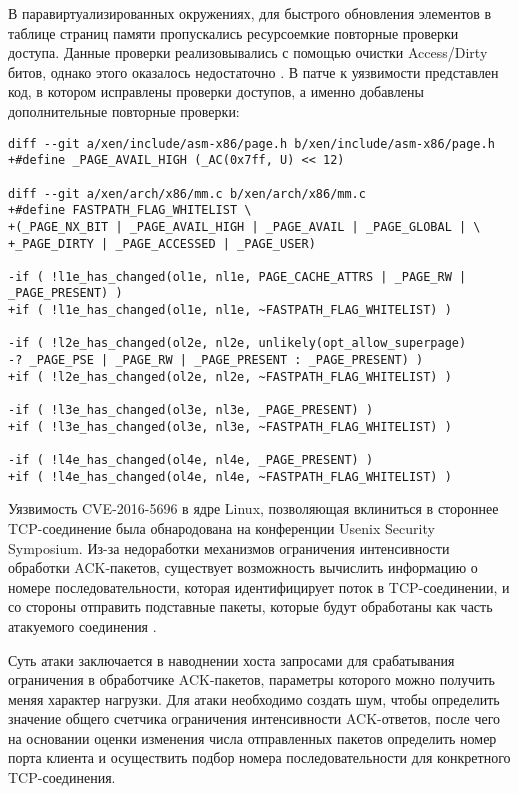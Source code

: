 В паравиртуализированных окружениях, для быстрого обновления элементов в таблице страниц памяти пропускались ресурсоемкие повторные проверки доступа.
Данные проверки реализовывались с помощью очистки Access/Dirty битов, однако этого оказалось недостаточно \cite{xsa182}.
В патче к уязвимости представлен код, в котором исправлены проверки доступов, а именно добавлены дополнительные повторные проверки:
\begin{lstlisting}
diff --git a/xen/include/asm-x86/page.h b/xen/include/asm-x86/page.h
+#define _PAGE_AVAIL_HIGH (_AC(0x7ff, U) << 12)

diff --git a/xen/arch/x86/mm.c b/xen/arch/x86/mm.c
+#define FASTPATH_FLAG_WHITELIST \
+(_PAGE_NX_BIT | _PAGE_AVAIL_HIGH | _PAGE_AVAIL | _PAGE_GLOBAL | \
+_PAGE_DIRTY | _PAGE_ACCESSED | _PAGE_USER)

-if ( !l1e_has_changed(ol1e, nl1e, PAGE_CACHE_ATTRS | _PAGE_RW | _PAGE_PRESENT) )
+if ( !l1e_has_changed(ol1e, nl1e, ~FASTPATH_FLAG_WHITELIST) )

-if ( !l2e_has_changed(ol2e, nl2e, unlikely(opt_allow_superpage)
-? _PAGE_PSE | _PAGE_RW | _PAGE_PRESENT : _PAGE_PRESENT) )
+if ( !l2e_has_changed(ol2e, nl2e, ~FASTPATH_FLAG_WHITELIST) )

-if ( !l3e_has_changed(ol3e, nl3e, _PAGE_PRESENT) )
+if ( !l3e_has_changed(ol3e, nl3e, ~FASTPATH_FLAG_WHITELIST) )

-if ( !l4e_has_changed(ol4e, nl4e, _PAGE_PRESENT) )
+if ( !l4e_has_changed(ol4e, nl4e, ~FASTPATH_FLAG_WHITELIST) )
\end{lstlisting}

Уязвимость CVE-2016-5696 в ядре Linux, позволяющая вклиниться в стороннее TCP-соединение была обнародована на конференции Usenix Security Symposium.
Из-за недоработки механизмов ограничения интенсивности обработки ACK-пакетов, существует возможность вычислить информацию о номере последовательности, которая идентифицирует поток в TCP-соединении, и со стороны отправить подставные пакеты, которые будут обработаны как часть атакуемого соединения \cite{tcp}.

Суть атаки заключается в наводнении хоста запросами для срабатывания ограничения в обработчике ACK-пакетов, параметры которого можно получить меняя характер нагрузки.
Для атаки необходимо создать шум, чтобы определить значение общего счетчика ограничения интенсивности ACK-ответов, после чего на основании оценки изменения числа отправленных пакетов определить номер порта клиента и осуществить подбор номера последовательности для конкретного TCP-соединения.

